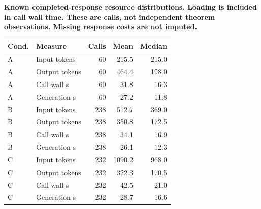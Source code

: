 \begin{center}\begin{minipage}{\linewidth}\centering
\textbf{Known completed-response resource distributions. Loading is included in call wall time. These are calls, not independent theorem observations. Missing response costs are not imputed.}\par\vspace{3pt}
\small
\begin{tabular}{llrrr}
\toprule
Cond. & Measure & Calls & Mean & Median \\
\midrule
A & Input tokens & 60 & 215.5 & 215.0 \\
A & Output tokens & 60 & 464.4 & 198.0 \\
A & Call wall s & 60 & 31.8 & 16.3 \\
A & Generation s & 60 & 27.2 & 11.8 \\
B & Input tokens & 238 & 512.7 & 369.0 \\
B & Output tokens & 238 & 350.8 & 172.5 \\
B & Call wall s & 238 & 34.1 & 16.9 \\
B & Generation s & 238 & 26.1 & 12.3 \\
C & Input tokens & 232 & 1090.2 & 968.0 \\
C & Output tokens & 232 & 322.3 & 170.5 \\
C & Call wall s & 232 & 42.5 & 21.0 \\
C & Generation s & 232 & 28.7 & 16.6 \\
\bottomrule
\end{tabular}
\end{minipage}\end{center}
